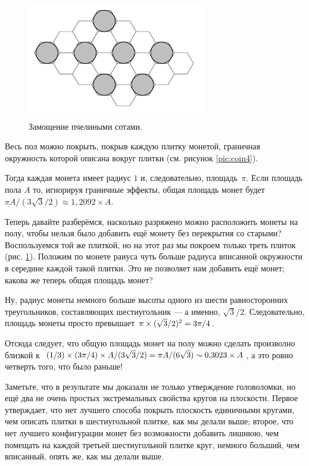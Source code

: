 \begin{figure}[t!]
\centering
\includegraphics[scale=1]{pics/coin5}
\caption{Замощение пчелиными сотами.}
\label{pic:coin5}
\end{figure}

Весь пол можно покрыть, покрыв каждую плитку монетой, граничная окружность которой описана вокруг плитки (см. рисунок \ref{pic:coin4}).

Тогда каждая монета имеет радиус $1$ и, следовательно, площадь~$\pi$.
Если площадь пола $A$ то, игнорируя граничные эффекты, общая площадь монет будет $\pi A/(3\sqrt{3}/2)\approx 1{,}2092\times A$.

Теперь давайте разберёмся, насколько разряжено можно расположить монеты на полу, чтобы нельзя было добавить ещё монету без перекрытия со старыми?
Воспользуемся той же плиткой, но на этот раз мы покроем только треть плиток (рис. \ref{pic:coin5}).
Положим по монете раиуса чуть больше радиуса вписанной окружности в середине каждой такой плитки. 
Это не позволяет нам добавить ещё монет; какова же теперь общая площадь монет?

Ну, радиус монеты немного больше высоты одного из шести равносторонних треугольников, составляющих шестиугольник — а именно, $\sqrt{3}/2$.
Следовательно, площадь монеты просто превышает $\pi \z\times (\sqrt{3}/2)^2 = 3\pi/4$.

Отсюда следует, что общую площадь монет на полу можно сделать произволно близкой к $(1/3) \times (3\pi/4) \times A/(3\sqrt{3}/2) = \pi A/(6 \sqrt{3}) \z\sim 0{,}3023 \times A$, а это ровно четверть того, что было раньше!

Заметьте, что в результате мы доказали не только утверждение головоломки, но ещё два не очень простых экстремальных свойства кругов на плоскости.
Первое утверждает, что нет лучшего способа покрыть плоскость единичными кругами, чем описать плитки в шестиугольной плитке, как мы делали выше;
второе, что нет лучшего конфигурации монет без возможности добавить лишнюю, чем помещать на каждой третьей шестиугольной плитке круг, немного больший, чем вписанный, опять же, как мы делали выше.

